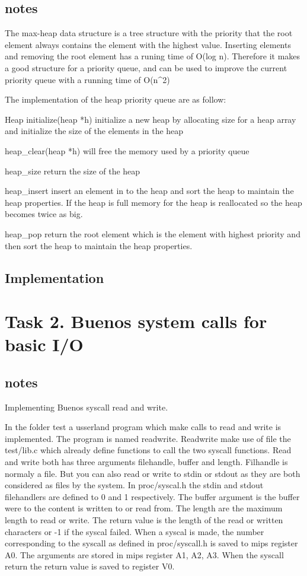 \documentclass[a4paper,12pt,danish]{report}
\begin{document}
\subsection{notes}

The max-heap data structure is a tree structure with the priority that the root element always contains
the element with the highest value. Inserting elements and removing the root element has a runing time of 
O(log n). Therefore it makes a good structure for a priority queue, and can be used to improve the 
current priority queue with a running time of O(n^2)


The implementation of the heap priority queue are as follow:

Heap initialize(heap *h) initialize a new heap by allocating size for a heap array and initialize the size of the 
elements in the heap

heap_clear(heap *h) will free the memory used by a priority queue

heap_size return the size of the heap

heap_insert insert an element in to the heap and sort the heap to maintain the heap properties.
If the heap is full memory for the heap is reallocated so the heap becomes twice as big.

heap_pop return the root element which is the element with highest priority and then sort the heap
to maintain the heap properties.

\subsection{Implementation}
\newpage
\section{Task 2. Buenos system calls for basic I/O}
\subsection{notes}
Implementing Buenos syscall read and write.

In the folder test a usserland program which make calls to read and write is implemented.
The program is named readwrite. Readwrite make use of file the test/lib.c which already define
functions to call the two syscall functions. Read and write both has three arguments filehandle, buffer
and length. Filhandle is normaly a file.
But you can also read or write to stdin or stdout as they are both considered as files by the system.
In proc/syscal.h the stdin and stdout filehandlers are defined to 0 and 1 respectively. The buffer argument is the buffer were to the content is written to or read from. The length are the maximum length to read or write. The return value is the length of the read or written characters or -1 if the syscal failed.
When a syscal is made, the number corresponding to the syscall as defined in proc/syscall.h is saved to mips register A0.
The arguments are stored in mips register A1, A2, A3. When the syscall return the return value is saved to register V0.
\end{document}

